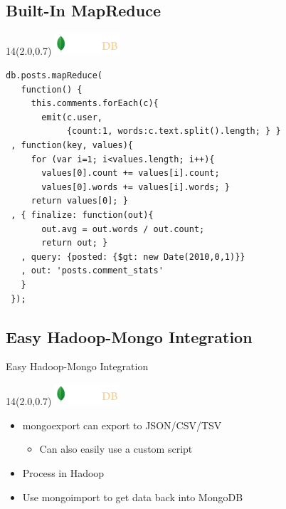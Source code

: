 \documentclass{beamer}
\newcommand{\MongoLogo}{
\begin{textblock}{14}(2.0,0.7)
  \includegraphics[height=0.8cm]{logo-mongodb-ondark.png}
\end{textblock}
}
\begin{document}
\subsection{Built-In MapReduce}
\begin{frame} [fragile]
  \MongoLogo

  \begin{small}
  \begin{verbatim}
db.posts.mapReduce(
   function() {
     this.comments.forEach(c){
       emit(c.user, 
            {count:1, words:c.text.split().length; } }
 , function(key, values){
     for (var i=1; i<values.length; i++){
       values[0].count += values[i].count;
       values[0].words += values[i].words; }
     return values[0]; }
 , { finalize: function(out){
       out.avg = out.words / out.count;
       return out; }
   , query: {posted: {$gt: new Date(2010,0,1)}}
   , out: 'posts.comment_stats'
   }
 });
  \end{verbatim}
  \end{small}
\end{frame}


\subsection{Easy Hadoop-Mongo Integration}
\begin{frame}{Easy Hadoop-Mongo Integration}
  \MongoLogo

  \begin{itemize}
    \item mongoexport can export to JSON/CSV/TSV
      \begin{itemize}
        \item Can also easily use a custom script
      \end{itemize}
    \item Process in Hadoop
    \item Use mongoimport to get data back into MongoDB
  \end{itemize}

\end{frame}
\end{document}
